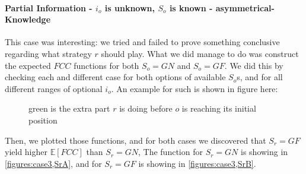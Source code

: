 \documentclass[a4paper,english,10pt]{article}
\newcommand{\len}{15}
\newcommand\rob{\ensuremath{r}\xspace}
\newcommand\opp{\ensuremath{o}\xspace}
\newcommand{\fcc}{\ensuremath{FCC}\xspace}
\newcommand{\gn}{\ensuremath{GN}\xspace}
\newcommand{\gf}{\ensuremath{GF}\xspace}
\begin{document}
\paragraph{Partial Information - $i_\opp$ is unknown, $S_\opp$ is known - asymmetrical-Knowledge}
This case was interesting: we tried and failed to prove something conclusive regarding what strategy \rob should play.
What we did manage to do was construct the expected \fcc functions for both $S_\opp = \gn$ and $S_\opp = \gf$. We did this by checking each and different case for both options of available $S_\opp$s, and for all different ranges of optional $i_\opp$. An example for such is shown in figure here:
\begin{figure}[H]
\caption{green is the extra part $r$ is doing before $o$ is reaching its initial position}
\end{figure}


Then, we plotted those functions, and for both cases we discovered that $S_\rob = \gf$ yield higher $\mathbb{E}[\fcc]$ than $S_\rob = \gn$,  The function for $S_\rob = \gn$ is showing in \ref{figures:case3,SrA}, and for $S_\rob = \gf$ is showing in \ref{figures:case3,SrB}.
\end{document}
